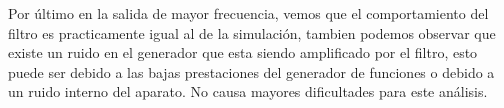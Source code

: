 Por \'ultimo en la salida de mayor frecuencia, vemos que el comportamiento del filtro es practicamente igual al de la simulaci\'on, tambien podemos  observar que existe un ruido en el generador que esta siendo amplificado por el filtro, esto puede ser debido a las bajas prestaciones del generador de funciones o debido a un ruido interno del aparato. No causa mayores dificultades para este an\'alisis.
\pagebreak
